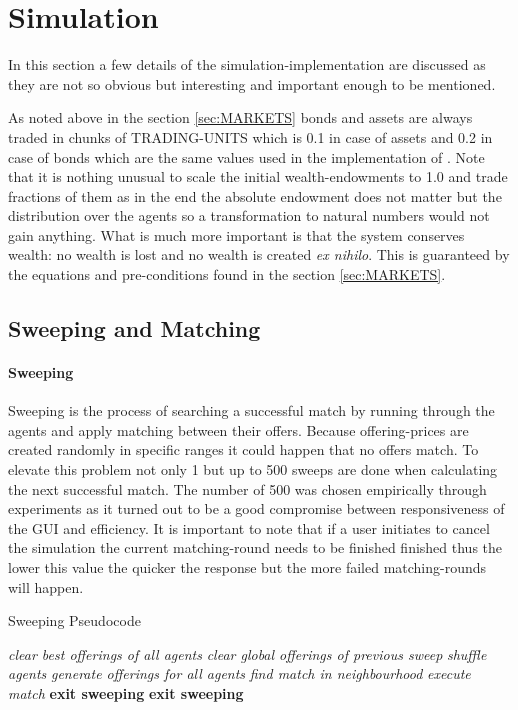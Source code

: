 \documentclass[Bachelorarbeit.tex]{subfiles}
\begin{document}
\section{Simulation}
In this section a few details of the simulation-implementation are discussed as they are not so obvious but interesting and important enough to be mentioned.

\medskip

As noted above in the section \ref{sec:MARKETS} bonds and assets are always traded in chunks of TRADING-UNITS which is 0.1 in case of assets and 0.2 in case of bonds which are the same values used in the implementation of \cite{Breuer2015}. Note that it is nothing unusual to scale the initial wealth-endowments to 1.0 and trade fractions of them as in the end the absolute endowment does not matter but the distribution over the agents so a transformation to natural numbers would not gain anything. What is much more important is that the system conserves wealth: no wealth is lost and no wealth is created \textit{ex nihilo}. This is guaranteed by the equations and pre-conditions found in the section \ref{sec:MARKETS}. 

\subsection{Sweeping and Matching}
\label{sec:implementation_sweepingAndMatching}

\paragraph{Sweeping}
Sweeping is the process of searching a successful match by running through the agents and apply matching between their offers. Because offering-prices are created randomly in specific ranges it could happen that no offers match. To elevate this problem not only 1 but up to 500 sweeps are done when calculating the next successful match. The number of 500 was chosen empirically through experiments as it turned out to be a good compromise between responsiveness of the GUI and efficiency. It is important to note that if a user initiates to cancel the simulation the current matching-round needs to be finished finished thus the lower this value the quicker the response but the more failed matching-rounds will happen.

\begin{algorithm}
\caption{Sweeping Pseudocode}
\begin{algorithmic}[1]
\State \textit{clear best offerings of all agents}
	\State \textit{clear global offerings of previous sweep}
	\State \textit{shuffle agents}
	\State \textit{generate offerings for all agents}
		\State \textit{find match in neighbourhood}
			\State \textit{execute match}
			\State \textbf{exit sweeping}
		\EndIf 
	\EndFor
	\State \textbf{exit sweeping}
	\EndIf
\EndWhile
\end{algorithmic}
\end{algorithm}
\end{document}
